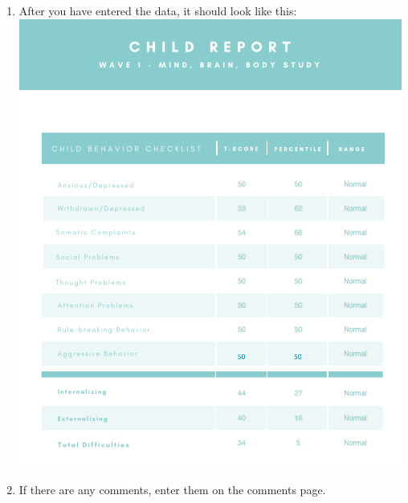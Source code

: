 \documentclass[]{book}
\begin{document}
\begin{enumerate}
\def\labelenumi{\arabic{enumi}.}
\setcounter{enumi}{4}
\item
  After you have entered the data, it should look like this:
  \includegraphics{images/report_card_online/4.png}
\item
  If there are any comments, enter them on the comments page.
\end{enumerate}
\end{document}
